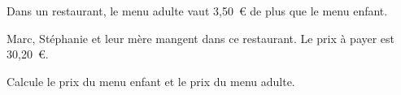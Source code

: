 Dans un restaurant, le menu adulte vaut 3,50~\textgreek{\euro} de plus que le menu enfant.

Marc, Stéphanie et leur mère mangent dans ce restaurant. Le prix à payer est 30,20~\textgreek{\euro}.\medskip

Calcule le prix du menu enfant et le prix du menu adulte.